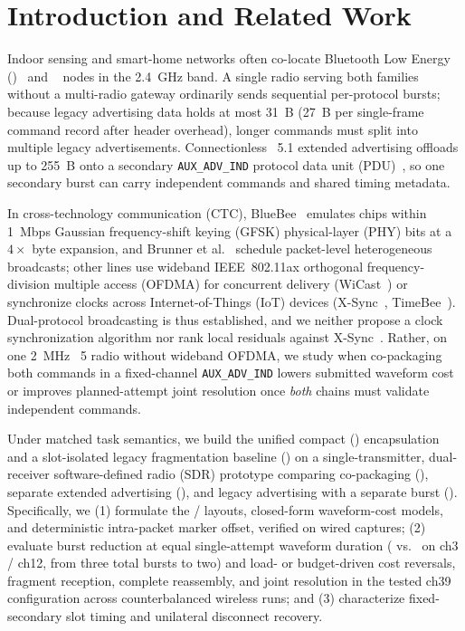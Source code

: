 \section{Introduction and Related Work}\label{sec:intro}

Indoor sensing and smart-home networks often co-locate Bluetooth Low Energy (\ble{})~\cite{bluetooth_core51} and \stdfour{}~\cite{ieee802154_2020} nodes in the \SI{2.4}{GHz} band. A single radio serving both families without a multi-radio gateway ordinarily sends sequential per-protocol bursts; because legacy \ble{} advertising data holds at most \SI{31}{B} (\SI{27}{B} per single-frame command record after header overhead), longer commands must split into multiple legacy advertisements. Connectionless \ble{}~5.1 extended advertising offloads up to \SI{255}{B} onto a secondary \texttt{AUX\_ADV\_IND} protocol data unit (PDU)~\cite{bluetooth_core51}, so one secondary burst can carry independent commands and shared timing metadata.

In cross-technology communication (CTC), BlueBee~\cite{jiang2017bluebee} emulates \stdfour{} chips within \SI{1}{Mbps} \ble{} Gaussian frequency-shift keying (GFSK) physical-layer (PHY) bits at a $4\times$ byte expansion, and Brunner et al.~\cite{brunner2021leveraging} schedule packet-level heterogeneous broadcasts; other lines use wideband IEEE~802.11ax orthogonal frequency-division multiple access (OFDMA) for concurrent delivery (WiCast~\cite{xia2025wicast}) or synchronize clocks across Internet-of-Things (IoT) devices (X-Sync~\cite{hofmann2021xsync}, TimeBee~\cite{gao2023timebee}). Dual-protocol broadcasting is thus established, and we neither propose a clock synchronization algorithm nor rank local residuals against X-Sync~\cite{hofmann2021xsync}. Rather, on one \SI{2}{MHz} \ble{}~5 radio without wideband OFDMA, we study when co-packaging both commands in a fixed-channel \texttt{AUX\_ADV\_IND} lowers submitted waveform cost or improves planned-attempt joint resolution once \emph{both} chains must validate independent commands.

Under matched task semantics, we build the unified compact (\proto{}) encapsulation and a slot-isolated legacy fragmentation baseline (\fragproto{}) on a single-transmitter, dual-receiver software-defined radio (SDR) prototype comparing co-packaging (\modejc{}), separate extended advertising (\modesc{}), and legacy advertising with a separate \stdfour{} burst (\modelc{}). Specifically, we (1) formulate the \proto{}/\fragproto{} layouts, closed-form waveform-cost models, and deterministic intra-packet marker offset, verified on wired captures; (2) evaluate burst reduction at equal single-attempt waveform duration (\modejc{} vs.\ \modesc{} on \ble{} ch3 / \stdfour{} ch12, from three total bursts to two) and load- or budget-driven cost reversals, fragment reception, complete reassembly, and joint resolution in the tested ch39 \modelc{} configuration across counterbalanced wireless runs; and (3) characterize fixed-secondary slot timing and unilateral disconnect recovery.
